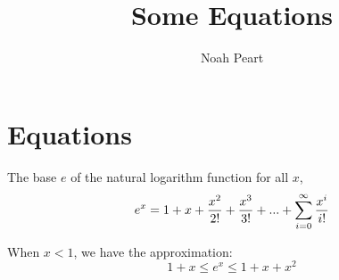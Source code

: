 \documentclass{article}
\begin{document}
\title{Some Equations}
\author{Noah Peart}

\maketitle

\section{Equations}
The base $e$ of the natural logarithm function for all $x$,
\begin{equation}
  \label{Natural Log}
  e^{x} = 1 + x + \frac{x^{2}}{2!} + \frac{x^{3}}{3!} + ... +  \sum_{\mathclap{i=0}}^{\infty} \frac{x^{i}}{i!}
\end{equation}

When $x < 1$, we have the approximation:
\begin{equation}
  1 + x \leq e^{x} \leq 1 + x + x^{2}
\end{equation}
\end{document}

